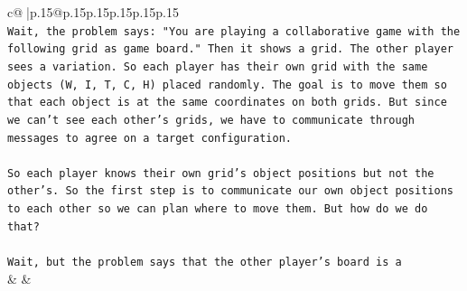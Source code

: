 \documentclass{article}
\begin{document}
{\begin{supertabular}{c@{$\;$}|p{.15\linewidth}@{}p{.15\linewidth}p{.15\linewidth}p{.15\linewidth}p{.15\linewidth}p{.15\linewidth}}
{{{\\ 
\texttt{Wait, the problem says: "You are playing a collaborative game with the following grid as game board." Then it shows a grid. The other player sees a variation. So each player has their own grid with the same objects (W, I, T, C, H) placed randomly. The goal is to move them so that each object is at the same coordinates on both grids. But since we can't see each other's grids, we have to communicate through messages to agree on a target configuration.} \\
\\ 
\texttt{So each player knows their own grid's object positions but not the other's. So the first step is to communicate our own object positions to each other so we can plan where to move them. But how do we do that?} \\
\\ 
\texttt{Wait, but the problem says that the other player's board is a} \\
            }
        }
    }
    & & \\ \\


\end{supertabular}}
\end{document}
